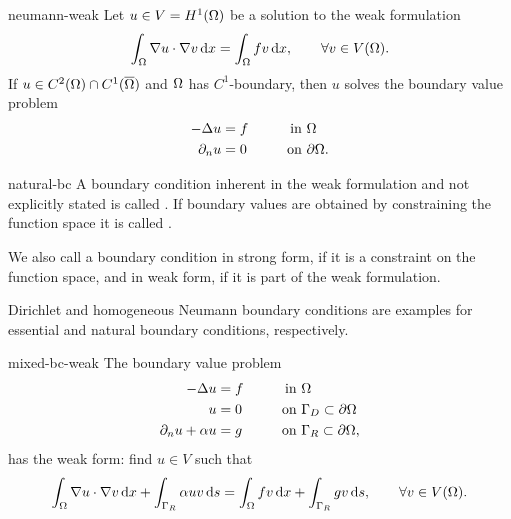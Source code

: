 \begin{Lemma}{neumann-weak}
  Let $u\in V=H^1(\Omega)$ be a solution to the weak formulation
  \begin{gather}
    \int_{\Omega} \nabla u\cdot\nabla v \,\mathrm{d} x
    = \int_{\Omega} fv\,\mathrm{d} x, \qquad\forall v\in V(\Omega).
  \end{gather}
  If $u\in C^2(\Omega) \cap C^1(\overline{\Omega})$ and $\Omega$
  has $C^1$-boundary, then $u$ solves the boundary value problem
  \begin{gather}
    \begin{aligned}
      -\Delta u &= f &\qquad \text{in } &\Omega\\
      \partial_n u &= 0 &\text{on } &\partial\Omega.
    \end{aligned}
  \end{gather}
\end{Lemma}

\begin{Definition}{natural-bc}
  A boundary condition inherent in the weak formulation and not
  explicitly stated is called . If
  boundary values are obtained by constraining the function space it
  is called .

  We also call a boundary condition in strong form, if it is a
  constraint on the function space, and in weak form, if it is part of
  the weak formulation.
\end{Definition}

\begin{remark}
  Dirichlet and homogeneous Neumann boundary conditions are examples
  for essential and natural boundary conditions, respectively.
\end{remark}

\begin{Lemma}{mixed-bc-weak}
  The boundary value problem
  \begin{gather}
    \begin{aligned}
      -\Delta u &= f &\qquad \text{in } &\Omega\\
      u &= 0 &\text{on } &\Gamma_D \subset \partial\Omega\\
      \partial_n u + \alpha u &= g &\text{on } &\Gamma_R \subset \partial\Omega,
    \end{aligned}
  \end{gather}
  has the weak form: find $u\in V$ such that
  \begin{gather}
    \int_{\Omega} \nabla u\cdot\nabla v \,\mathrm{d} x
    + \int_{\Gamma_R}\alpha u v \,\mathrm{d} s
    = \int_{\Omega} f v\,\mathrm{d} x
    + \int_{\Gamma_R} g v \,\mathrm{d} s, \qquad\forall v\in V(\Omega).    
  \end{gather}
\end{Lemma}

